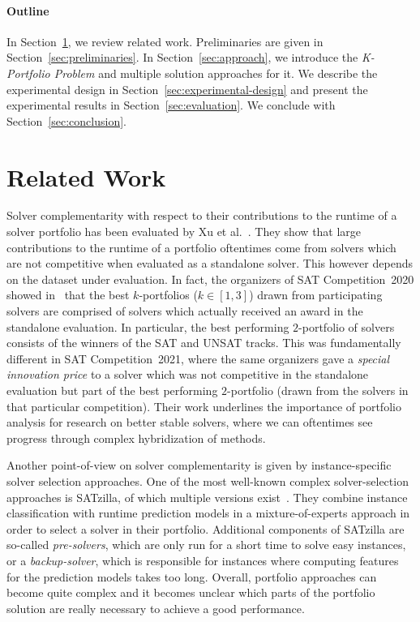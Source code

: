 \documentclass[conference]{IEEEtran}
\begin{document}
\paragraph{Outline}

In Section~\ref{sec:related-work}, we review related work. 
Preliminaries are given in Section~\ref{sec:preliminaries}. 
In Section~\ref{sec:approach}, we introduce the \emph{K-Portfolio Problem} and multiple solution approaches for it. 
We describe the experimental design in Section~\ref{sec:experimental-design} and present the experimental results in Section~\ref{sec:evaluation}. 
We conclude with Section~\ref{sec:conclusion}. 

\section{Related Work}
\label{sec:related-work}

Solver complementarity with respect to their contributions to the runtime of a solver portfolio has been evaluated by Xu et al.~\cite{Xu:2012:EvalContribVBS}. 
They show that large contributions to the runtime of a portfolio oftentimes come from solvers which are not competitive when evaluated as a standalone solver. 
This however depends on the dataset under evaluation. 
In fact, the organizers of SAT Competition~2020 showed in~\cite{SC2020:AIJ} that the best $k$-portfolios ($k \in [1,3]$) drawn from participating solvers are comprised of solvers which actually received an award in the standalone evaluation. 
In particular, the best performing $2$-portfolio of solvers consists of the winners of the SAT and UNSAT tracks. 
This was fundamentally different in SAT Competition~2021, where the same organizers gave a \emph{special innovation price} to a solver which was not competitive in the standalone evaluation but part of the best performing $2$-portfolio (drawn from the solvers in that particular competition). 
Their work underlines the importance of portfolio analysis for research on better stable solvers, where we can oftentimes see progress through complex hybridization of methods. 

Another point-of-view on solver complementarity is given by instance-specific solver selection approaches. 
One of the most well-known complex solver-selection approaches is SATzilla, of which multiple versions exist~\cite{xu2008satzilla, xu2012satzilla2012}. 
They combine instance classification with runtime prediction models in a mixture-of-experts approach in order to select a solver in their portfolio. 
Additional components of SATzilla are so-called \emph{pre-solvers}, which are only run for a short time to solve easy instances, or a \emph{backup-solver}, which is responsible for instances where computing features for the prediction models takes too long. 
Overall, portfolio approaches can become quite complex and it becomes unclear which parts of the portfolio solution are really necessary to achieve a good performance.
\end{document}
